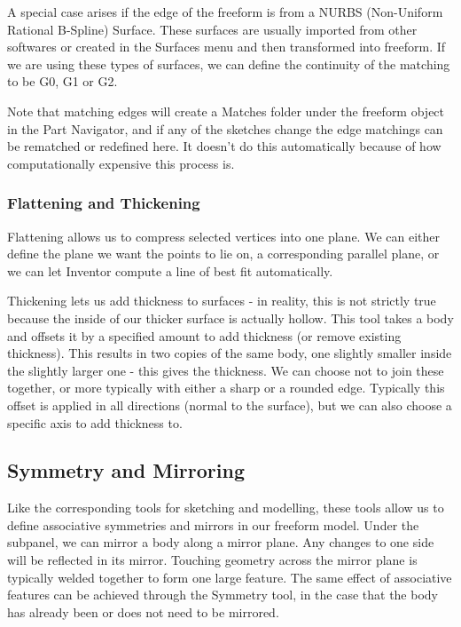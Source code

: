 A special case arises if the edge of the freeform is from a NURBS (Non-Uniform Rational B-Spline) Surface. These surfaces are usually imported from other softwares or created in the Surfaces menu and then transformed into freeform. If we are using these types of surfaces, we can define the continuity of the matching to be G0, G1 or G2.

Note that matching edges will create a Matches folder under the freeform object in the Part Navigator, and if any of the sketches change the edge matchings can be rematched or redefined here. It doesn't do this automatically because of how computationally expensive this process is. 

\subsubsection{Flattening and Thickening}

Flattening allows us to compress selected vertices into one plane. We can either define the plane we want the points to lie on, a corresponding parallel plane, or we can let Inventor compute a line of best fit automatically.

Thickening lets us add thickness to surfaces - in reality, this is not strictly true because the inside of our thicker surface is actually hollow. This tool takes a body and offsets it by a specified amount to add thickness (or remove existing thickness). This results in two copies of the same body, one slightly smaller inside the slightly larger one - this gives the thickness. We can choose not to join these together, or more typically with either a sharp or a rounded edge. Typically this offset is applied in all directions (normal to the surface), but we can also choose a specific axis to add thickness to.

\subsection{Symmetry and Mirroring}

Like the corresponding tools for sketching and modelling, these tools allow us to define associative symmetries and mirrors in our freeform model. Under the  subpanel, we can mirror a body along a mirror plane. Any changes to one side will be reflected in its mirror. Touching geometry across the mirror plane is typically welded together to form one large feature. The same effect of associative features can be achieved through the Symmetry tool, in the case that the body has already been or does not need to be mirrored.

